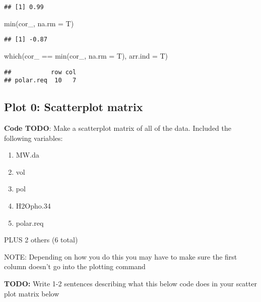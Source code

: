 \documentclass[
]{book}
\newenvironment{Shaded}{\begin{snugshade}}{\end{snugshade}}
\newcommand{\AttributeTok}[1]{\textcolor[rgb]{0.77,0.63,0.00}{#1}}
\newcommand{\FunctionTok}[1]{\textcolor[rgb]{0.00,0.00,0.00}{#1}}
\newcommand{\NormalTok}[1]{#1}
\newcommand{\SpecialCharTok}[1]{\textcolor[rgb]{0.00,0.00,0.00}{#1}}
\providecommand{\tightlist}{%
  \setlength{\itemsep}{0pt}\setlength{\parskip}{0pt}}
\begin{document}
\begin{verbatim}
## [1] 0.99
\end{verbatim}

\begin{Shaded}
\begin{Highlighting}[]
\FunctionTok{min}\NormalTok{(cor\_, }\AttributeTok{na.rm =}\NormalTok{ T)}
\end{Highlighting}
\end{Shaded}

\begin{verbatim}
## [1] -0.87
\end{verbatim}

\begin{Shaded}
\begin{Highlighting}[]
\FunctionTok{which}\NormalTok{(cor\_ }\SpecialCharTok{==} \FunctionTok{min}\NormalTok{(cor\_, }\AttributeTok{na.rm =}\NormalTok{ T), }\AttributeTok{arr.ind =}\NormalTok{ T)}
\end{Highlighting}
\end{Shaded}

\begin{verbatim}
##           row col
## polar.req  10   7
\end{verbatim}

\hypertarget{plot-0-scatterplot-matrix}{%
\subsection{Plot 0: Scatterplot matrix}\label{plot-0-scatterplot-matrix}}

\textbf{Code TODO}: Make a scatterplot matrix of all of the data. Included the following variables:

\begin{enumerate}
\def\labelenumi{\arabic{enumi}.}
\tightlist
\item
  MW.da
\item
  vol
\item
  pol
\item
  H2Opho.34
\item
  polar.req
\end{enumerate}

PLUS 2 others (6 total)

NOTE: Depending on how you do this you may have to make sure the first column doesn't go into the plotting command

\textbf{TODO:} Write 1-2 sentences describing what this below code does in your scatter plot matrix below
\end{document}
